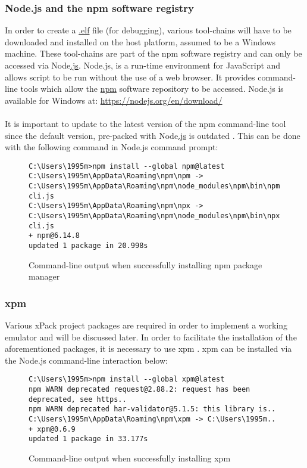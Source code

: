 \subsubsection{Node.js and the npm software registry}
\label{npm}
In order to create a \hyperref[listExt]{.elf} file (for debugging), various tool-chains will have to be downloaded and installed on the host platform, assumed to be a Windows machine. These tool-chains are part of the npm software registry and can only be accessed via  Node\hyperref[listExt]{.js}. Node.js, is a run-time environment for JavaScript and allows script to be run without the use of a web browser. It provides command-line tools which allow the \hyperref[listAbr]{npm} software repository to be accessed. Node.js is available for Windows at: \color{blue}\url{https://nodejs.org/en/download/} \color{black}
\\\\
It is important to update to the latest version of the npm command-line tool since the default version, pre-packed with Node\hyperref[listExt]{.js} is outdated \cite{emailIl}\cite{xPack}. This can be done with the following command in Node.js command prompt:

\begin{figure}[H]
\begin{center}
\begin{lstlisting}[style=DOS]
C:\Users\1995m>npm install --global npm@latest
C:\Users\1995m\AppData\Roaming\npm\npm -> C:\Users\1995m\AppData\Roaming\npm\node_modules\npm\bin\npm-cli.js
C:\Users\1995m\AppData\Roaming\npm\npx -> C:\Users\1995m\AppData\Roaming\npm\node_modules\npm\bin\npx-cli.js
+ npm@6.14.8
updated 1 package in 20.998s
\end{lstlisting}
\label{fig:cmd1}
\caption{Command-line output when successfully installing npm package manager}
\end{center}
\end{figure}

\subsubsection{xpm}
\label{xpm}
Various xPack project packages are required in order to implement a working emulator and will be discussed later. In order to facilitate the installation of the aforementioned packages, it is necessary to use xpm \cite{xPack}. xpm can be installed via the Node.js command-line interaction below:

\begin{figure}[H]
\begin{center}
\begin{lstlisting}[style=DOS]
C:\Users\1995m>npm install --global xpm@latest
npm WARN deprecated request@2.88.2: request has been deprecated, see https..
npm WARN deprecated har-validator@5.1.5: this library is..
C:\Users\1995m\AppData\Roaming\npm\xpm -> C:\Users\1995m..
+ xpm@0.6.9
updated 1 package in 33.177s
\end{lstlisting}
\caption{Command-line output when successfully installing xpm}
\label{fig:cmd2}
\end{center}
\end{figure}

